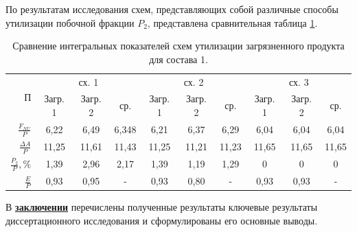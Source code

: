 По результатам исследования схем, представляющих собой различные способы утилизации побочной фракции $P_2$, представлена сравнительная таблица \ref{3loopautoref}.
\begin{table}
  \centering
  \caption{Сравнение интегральных показателей схем утилизации загрязненного продукта для состава 1.{\label{3loopautoref}}}
  \renewcommand{\arraystretch}{1.2}
  \begin{tabular}{|r|c|c|c|c|c|c|c|c|c|}
    \hline
    \multirow{2}{*}{П} & \multicolumn{3}{c|}{сх. 1} & \multicolumn{3}{c|}{сх. 2} & \multicolumn{3}{c|}{сх. 3}\\
    \cline{2-10}
    & {\tiny Загр.} 1 & {\tiny Загр.} 2 & ср. & {\tiny Загр.} 1 & {\tiny Загр.} 2 & ср. & {\tiny Загр.} 1 & {\tiny Загр.} 2 & ср. \\
    \hline
    $\frac{F_{NU}}{P}$ & 6,22 & 6,49 & 6,348 & 6,21 & 6,37 & 6,29 & 6,04 & 6,04 & 6,04\\ \hline
    $\frac{\Delta A}{P}$ & 11,25 & 11,61 & 11,43 & 11,25 & 11,21 & 11,23 & 11,65 & 11,65 & 11,65 \\ \hline
    $\frac{P_2}{P}, \%$  & 1,39 & 2,96 & 2,17 & 1,39 & 1,19 & 1,29 & 0 & 0 & 0 \\ \hline
    $\frac{E}{P}$     & 0,93 & 0,95 & - & 0,93 & 0,80 & - & 0,93 & 0,93 & - \\ \hline
  \end{tabular}
\end{table}

\newpage

В \underline{\textbf{заключении}} перечислены полученные результаты ключевые результаты диссертационного исследования и сформулированы его основные выводы.



\insertbibliofull   
{}
